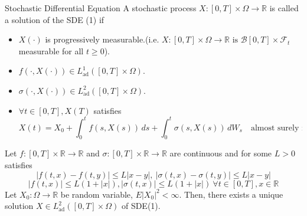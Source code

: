 \documentclass[final]{beamer}
\newcommand{\E}{E}
\newlength{\colwidth}
\begin{document}
\begin{frame}[t]
\begin{columns}[t]
\begin{column}{\colwidth}
\begin{block}{Stochastic Differential Equation}
    A stochastic process $X \colon [0,T] \times \Omega \rightarrow \mathbb{R}$ is called a solution of the SDE (1) if
    \begin{itemize}
        \item $X(\cdot)$ is progressively measurable.(i.e. $X \colon [0,T] \times \Omega \rightarrow \mathbb{R} \text{ is } \mathcal{B}[0,T]\times\mathcal{F}_t$ measurable for all $t \geq 0$).
        \item $f(\cdot,X(\cdot)) \in L_{\text{ad}}^1([0,T] \times \Omega)$.
        \item $\sigma(\cdot,X(\cdot)) \in L_{\text{ad}}^2([0,T] \times \Omega)$.
        \item $\forall t \in [0,T],X(T)$ satisfies
        \[X(t) = X_0 + \int_0^t f(s,X(s))\,ds + \int_0^t \sigma(s,X(s))\,dW_s \quad \text{almost surely in} \ P.\]
    \end{itemize}


    Let $f \colon [0,T] \times \mathbb{R} \rightarrow \mathbb{R}$ and $\sigma \colon [0,T] \times \mathbb{R} \rightarrow \mathbb{R}$ are continuous and for some $L > 0$ satisfies 
    \[ \left|f(t,x) - f(t,y)\right| \leq L\left|x-y\right|, \ \left|\sigma(t,x) - \sigma(t,y)\right| \leq L\left|x-y\right|\]
    \[ \left|f(t,x)\right| \leq L(1+\left|x\right|) ,\left|\sigma(t,x)\right| \leq L(1+\left|x\right|) \ \forall t \in [0,T], x \in \mathbb{R}\]
    Let $X_0 \colon \Omega \rightarrow \mathbb{R}$ be random variable, ${\E}\left|X_0\right|^2 < \infty $. Then, there exists a unique solution $X \in L^2_\text{ad}([0,T] \times \Omega)$ of SDE(1).


\end{block}
\end{column}
\end{columns}
\end{frame}
\end{document}
